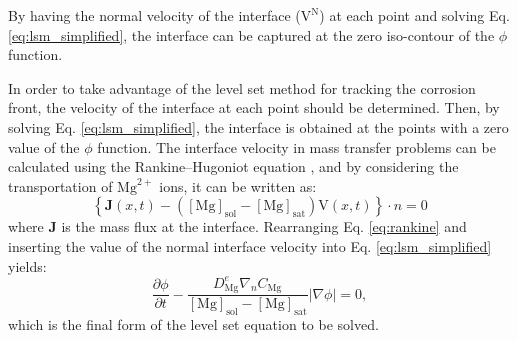 By having the normal velocity of the interface ($\mathrm{V}^\mathrm{N}$) at each point and solving Eq. \ref{eq:lsm_simplified}, the interface can be captured at the zero iso-contour of the $\phi$ function.

In order to take advantage of the level set method for tracking the corrosion front, the velocity of the interface at each point should be determined. Then, by solving Eq. \ref{eq:lsm_simplified}, the interface is obtained at the points with a zero value of the $\phi$ function. The interface velocity in mass transfer problems can be calculated using the Rankine–Hugoniot equation \cite{Scheiner2007}, and by considering the transportation of $\mathrm{Mg}^{2+}$ ions, it can be written as:
\begin{equation} \label{eq:rankine}
\left\{\mathbf{J}(x, t)-\left([\mathrm{Mg}]_{\mathrm{sol}}-[\mathrm{Mg}]_{\mathrm{sat}}\right) \mathrm{V}(x, t)\right\} \cdot n=0
\end{equation}
where $\mathbf{J}$ is the mass flux at the interface. Rearranging Eq. \ref{eq:rankine} and inserting the value of the normal interface velocity into Eq. \ref{eq:lsm_simplified} yields:
\begin{equation} \label{eq:lsm_final}
\frac{\partial \phi}{\partial t}-\frac{D_{\mathrm{Mg}}^{e} \nabla_{n} C_\mathrm{Mg}}{[\mathrm{Mg}]_{\mathrm{sol}}-[\mathrm{Mg}]_{\mathrm{sat}}}|\nabla \phi|=0,
\end{equation}
which is the final form of the level set equation to be solved. 